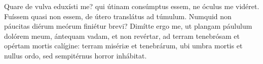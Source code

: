 Quare de vulva eduxísti me?
	qui útinam consúmptus essem, ne óculus me vidéret.
Fuíssem quasi non essem, de útero translátus ad túmulum.
Numquid non páucitas diérum meórum finiétur brevi?
Dimítte ergo me, ut plangam páululum dolórem meum,
	ántequam vadam, et non revértar,
	ad terram tenebrósam et opértam mortis calígine:
	terram misériæ et tenebrárum, ubi umbra mortis et nullus ordo,
	sed sempitérnus horror inhábitat.
